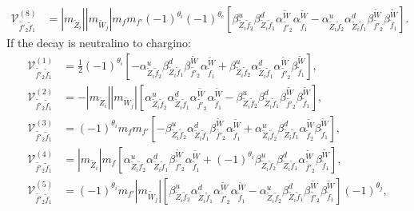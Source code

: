 \documentclass[final,3p,times]{elsarticle}
\begin{document}
\begin{align}
\mathcal{V}_{\tilde{f'}_2 \tilde{f}_1}^{(8)} &= |m_{\tilde{Z}_i}||m_{\tilde{W}_j}|m_{f} m_{f'} (-1)^{\theta_i} (-1)^{\theta_c} \left[\beta_{\tilde{Z}_i \tilde{f}_2}^{u}\beta_{\tilde{Z}_i \tilde{f}_1}^{d} \alpha_{\tilde{f'}_2}^{\tilde{W}} \alpha_{\tilde{f}_1}^{\tilde{W}} - \alpha_{\tilde{Z}_i \tilde{f}_2}^{u} \alpha_{\tilde{Z}_i \tilde{f}_1}^{d} \beta_{\tilde{f'}_2}^{\tilde{W}} \beta_{\tilde{f}_1}^{\tilde{W}}\right].
\end{align}
If the decay is neutralino to chargino:
\begin{align}
\mathcal{V}_{\tilde{f'}_2 \tilde{f}_1}^{(1)} &= \frac{1}{2}(-1)^{\theta_i}\left[-\alpha_{\tilde{Z}_i \tilde{f}_2}^{u} \beta_{\tilde{Z}_i \tilde{f}_1}^{d} \beta_{\tilde{f'}_2}^{\tilde{W}}\alpha_{\tilde{f}_1}^{\tilde{W}} + \beta_{\tilde{Z}_i \tilde{f}_2}^{u} \alpha_{\tilde{Z}_i \tilde{f}_1}^{d} \alpha_{\tilde{f'}_2}^{\tilde{W}} \beta_{\tilde{f}_1}^{\tilde{W}}\right], \\
\mathcal{V}_{\tilde{f'}_2 \tilde{f}_1}^{(2)} &= -|m_{\tilde{Z}_i}||m_{\tilde{W}_j}|\left[\alpha_{\tilde{Z}_i \tilde{f}_2}^{u} \alpha_{\tilde{Z}_i \tilde{f}_1}^{d} \alpha_{\tilde{f'}_2}^{\tilde{W}} \alpha_{\tilde{f}_1}^{\tilde{W}} - \beta_{\tilde{Z}_i \tilde{f}_2}^{u} \beta_{\tilde{Z}_{i} \tilde{f}_1}^{d} \beta_{\tilde{f'}_2}^{\tilde{W}} \beta_{\tilde{f}_1}^{\tilde{W}}\right], \\
\mathcal{V}_{\tilde{f'}_2 \tilde{f}_1}^{(3)} &= (-1)^{\theta_i} m_{f}m_{f'}\left[-\beta_{\tilde{Z}_i \tilde{f}_2}^{u} \alpha_{\tilde{Z}_i \tilde{f}_1}^{d} \beta_{\tilde{f'}_2}^{\tilde{W}} \alpha_{\tilde{f}_1}^{\tilde{W}} +  \alpha_{\tilde{Z}_i \tilde{f}_2}^{u} \beta_{\tilde{Z}_i \tilde{f}_1}^{d} \alpha_{\tilde{f}_2}^{\tilde{W}} \beta_{\tilde{f}_1}^{\tilde{W}}\right], \\
\mathcal{V}_{\tilde{f'}_2 \tilde{f}_1}^{(4)} &= |m_{\tilde{Z}_i}|m_{f}\left[\alpha_{\tilde{Z}_i \tilde{f}_2}^{u} \alpha_{\tilde{Z}_i \tilde{f}_1}^{d} \beta_{\tilde{f'}_2}^{\tilde{W}}\alpha_{\tilde{f}_1}^{\tilde{W}} + (-1)^{\theta_i} \beta_{\tilde{Z}_i \tilde{f}_2}^{u} \beta_{\tilde{Z}_i \tilde{f}_1}^{d} \alpha_{\tilde{f'}_2}^{\tilde{W}} \beta_{\tilde{f}_1}^{\tilde{W}}\right], \\
\mathcal{V}_{\tilde{f'}_2 \tilde{f}_1}^{(5)} &= (-1)^{\theta_i} m_{f'} |m_{\tilde{W}_j}|\left[ \beta_{\tilde{Z}_i \tilde{f}_2}^{u} \alpha_{\tilde{Z}_i \tilde{f}_1}^{d} \alpha_{\tilde{f'}_2}^{\tilde{W}} \alpha_{\tilde{f}_1}^{\tilde{W}} - \alpha_{\tilde{Z}_i \tilde{f}_2}^{u} \beta_{\tilde{Z}_i \tilde{f}_1}^{d} \beta_{\tilde{f'}_2}^{\tilde{W}} \beta_{\tilde{f}_1}^{\tilde{W}}\right](-1)^{\theta_j}, \\

\end{align}
\end{document}
